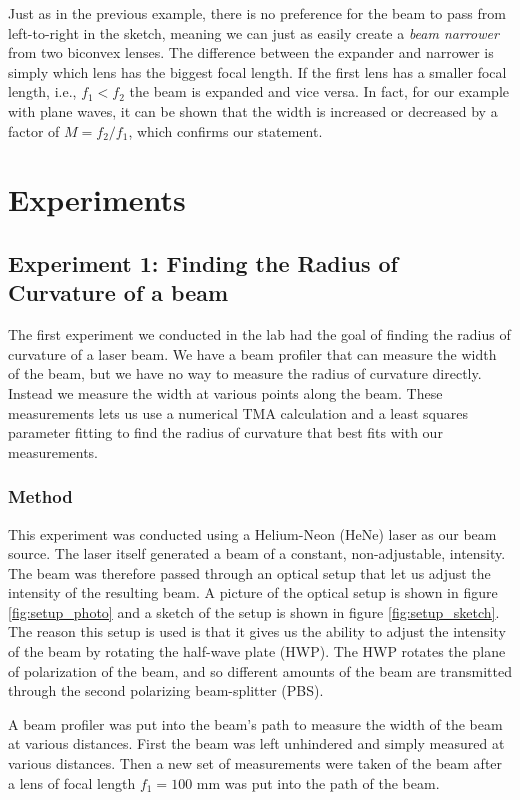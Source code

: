 \documentclass[a4paper, 11pt, notitlepage, english]{article}
\begin{document}
Just as in the previous example, there is no preference for the beam to pass from left-to-right in the sketch, meaning we can just as easily create a \emph{beam narrower} from two biconvex lenses. The difference between the expander and narrower is simply which lens has the biggest focal length. If the first lens has a smaller focal length, i.e., $f_1 < f_2$ the beam is expanded and vice versa. In fact, for our example with plane waves, it can be shown that the width is increased or decreased by a factor of $M = f_2/f_1$, which confirms our statement. 

\section{Experiments}

\subsection{Experiment 1: Finding the Radius of Curvature of a beam}

The first experiment we conducted in the lab had the goal of finding the radius of curvature of a laser beam. We have a beam profiler that can measure the width of the beam, but we have no way to measure the radius of curvature directly. Instead we measure the width at various points along the beam. These measurements lets us use a numerical TMA calculation and a least squares parameter fitting to find the radius of curvature that best fits with our measurements. 

\subsubsection{Method}

This experiment was conducted using a Helium-Neon (HeNe) laser as our beam source. The laser itself generated a beam of a constant, non-adjustable, intensity. The  beam was therefore passed through an optical setup that let us adjust the intensity of the resulting beam. A picture of the optical setup is shown in figure \ref{fig:setup_photo} and a sketch of the setup is shown in figure \ref{fig:setup_sketch}. The reason this setup is used is that it gives us the ability to adjust the intensity of the beam by rotating the half-wave plate (HWP). The HWP rotates the plane of polarization of the beam, and so different amounts of the beam are transmitted through the second polarizing beam-splitter (PBS).

A beam profiler was put into the beam's path to measure the width of the beam at various distances. First the beam was left unhindered and simply measured at various distances. Then a new set of measurements were taken of the beam after a lens of focal length $f_1=100$ mm was put into the path of the beam.
\end{document}
